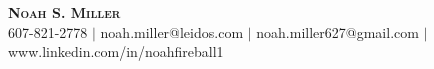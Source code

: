 \begin{center}
    \textbf{\Huge \scshape Noah S. Miller} \\ \vspace{1pt}
    \small 607{-}821{-}2778 $|$ noah.miller@leidos.com $|$ noah.miller627@gmail.com $|$
    www.linkedin.com/in/noahfireball1
\end{center}